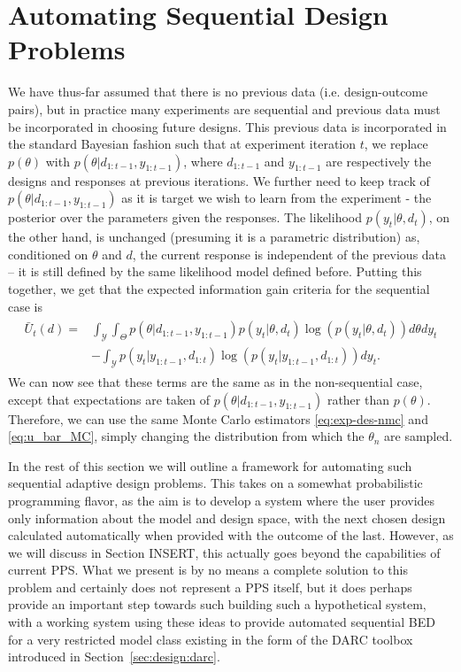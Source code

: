 
\section{Automating Sequential Design Problems}
\label{sec:design:seq}

We have thus-far assumed that there is no previous data (i.e. design-outcome pairs), but in practice many 
experiments are sequential and previous data must be incorporated in choosing future designs.
This previous data is incorporated in the standard Bayesian fashion such that
at experiment iteration $t$, we replace $p\left(\theta\right)$ with 
$p\left(\theta | d_{1:t-1}, y_{1:t-1}\right)$, where $d_{1:t-1}$ and  $y_{1:t-1}$ are 
respectively the designs and responses at previous iterations.
We further need to keep track of $p\left(\theta | d_{1:t-1}, y_{1:t-1}\right)$ as it is target we wish
to learn from the experiment - the posterior over the parameters given the responses.
The likelihood $p\left(y_t | \theta, d_t\right)$, on the other hand, is unchanged (presuming it 
is a parametric distribution) as, conditioned on 
$\theta$ and $d$, the current response is independent of the previous data -- it is still defined 
by the same likelihood model defined before.
Putting this together, we get that the expected information gain criteria for the
sequential case is
\begin{align}
\label{eq:u_bar_seq}
\begin{split}
\bar{U}_t(d)
=&\int_{\mathcal{Y}}\int_{\Theta} p\left(\theta | d_{1:t-1}, y_{1:t-1}\right)
p(y_t | \theta, d_t) \log(p(y_t | \theta, d_t)) d\theta dy_t \\
&- \int_{\mathcal{Y}} p(y_t | y_{1:t-1}, d_{1:t}) \log(p(y_t | y_{1:t-1}, d_{1:t}))dy_t.
\end{split}
\end{align}
We can now see that these terms are the same as in the non-sequential case,
except that expectations are taken of $p\left(\theta | d_{1:t-1}, y_{1:t-1}\right)$
rather than $p(\theta)$.  Therefore, we can use the same Monte Carlo estimators
\eqref{eq:exp-des-nmc} and \eqref{eq:u_bar_MC}, simply changing the distribution from which
the $\theta_n$ are sampled.

In the rest of this section we will outline a framework for automating such sequential
adaptive design problems.  This takes on a somewhat probabilistic programming flavor, as
the aim is to develop a system where the user provides only information about the model and
design space, with the next chosen design calculated automatically when provided with
the outcome of the last.  However, as we will discuss in Section INSERT, this actually goes
beyond the capabilities of current PPS.  What we present is by no means a complete solution to
this problem and certainly does not represent a PPS itself, but it does perhaps provide an important
step towards such building such a hypothetical system, with a working system using these ideas
to provide automated sequential BED for a very restricted model class existing in the form of
the DARC toolbox introduced in Section~\ref{sec:design:darc}.

